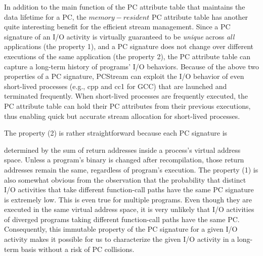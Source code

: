 {\color{blue}
In addition to the main function of the PC attribute table that maintains 
the data lifetime for a PC, the $memory-resident$ PC attribute table has 
another quite interesting benefit for the efficient
stream management.  Since a PC signature of an I/O activity is virtually 
guaranteed to be {\it unique} across {\it all} applications (the property 1),  
and a PC signature does not change over different executions of the same 
application (the property 2), the PC attribute table can capture a long-term 
history of programs' I/O behaviors.  
Because of the above two properties of a PC signature, PCStream can 
exploit the I/O behavior of even short-lived processes 
(e.g., cpp and cc1 for GCC)  that are launched and terminated frequently.  
When short-lived processes are frequently executed, the PC attribute table 
can hold their PC attributes from their previous executions, 
thus enabling quick but accurate stream allocation for short-lived
processes.

The property (2) is rather straightforward because each PC signature is 
}
determined by the sum of return addresses inside a process's
virtual address space.  Unless a program's binary is changed after
recompilation, those return addresses remain the same, regardless of program's
execution.  
{\color{blue}
The property (1) is also somewhat obvious from the observation
}
that the probability that distinct I/O activities that take
different function-call paths have the same PC signature is extremely low. This
is even true for multiple programs. Even though they are executed in the same
virtual address space, it is very unlikely that I/O activities of diverged
programs taking different function-call paths have the same PC.  
Consequently, this immutable property of
the PC signature for a given I/O activity makes it possible for us to characterize 
{\color{blue}
the given I/O activity in a long-term basis without a risk of PC collisions.
}


